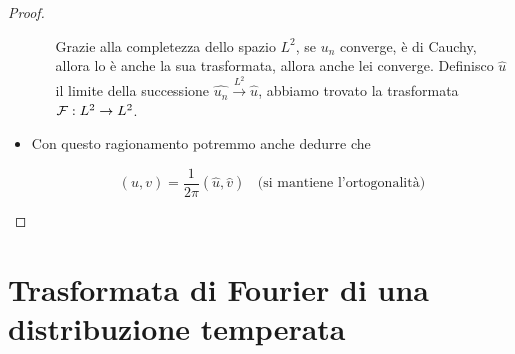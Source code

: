 \begin{proof}
\begin{itemize}
\begin{itemize}
Grazie alla completezza dello spazio $L^{2}$, se $u_{n}$ converge, è di Cauchy, allora lo è anche la sua trasformata, allora anche lei converge. Definisco $\hat{u}$ il limite della successione $\widehat{u_{n}}\xrightarrow{L^{2}}\hat{u}$, abbiamo trovato la trasformata $\mathcal{F} : L^{2}\rightarrow L^{2}$.
\end{itemize}
\item Con questo ragionamento potremmo anche dedurre che

\begin{equation*}
(u, v) = \frac{1}{2\pi}(\hat{u}, \hat{v}) \ \ \ \ \text{(si mantiene l'ortogonalità)}
\end{equation*}
\end{itemize}
\end{proof}

\section{Trasformata di Fourier di una distribuzione temperata}

